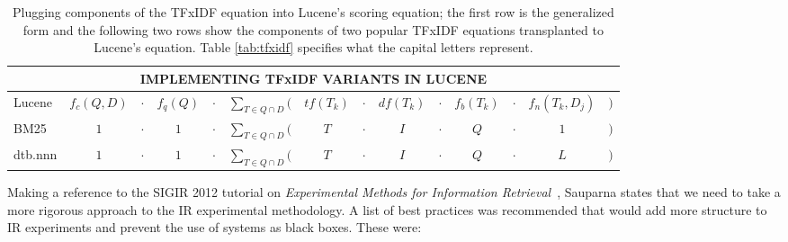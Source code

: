 \begin{table}
\begin{minipage}[t]{0.65\textwidth}
  \end{minipage}
\end{table}

\begin{table}[bht!]
  \centering
  \small
  \begin{minipage}[t]{0.94\textwidth}

    \begin{tabular}{lccccccccccccc}
      \multicolumn{14}{c}{IMPLEMENTING TFxIDF VARIANTS IN LUCENE}
      \\
      \hline\hline

      Lucene    & $f_{c}(Q,D)$ & $\cdot$  & $f_{q}(Q)$
      & $\cdot$ & $\displaystyle\sum_{T \in Q \cap D}($  & $tf(T_{k})$
      & $\cdot$ & $df(T_{k})$  & $\cdot$  & $f_{b}(T_{k})$
      & $\cdot$ & $f_{n}(T_{k}, D_{j})$   & $)$ \\
      
      BM25      & $1$          &  $\cdot$ & $1$
      & $\cdot$ & $\displaystyle\sum_{T \in Q \cap D}($  & $T$
      & $\cdot$ & $I$          & $\cdot$  & $Q$
      & $\cdot$ & $1$          & $)$ \\

      dtb.nnn   & $1$          & $\cdot$  & $1$
      & $\cdot$ & $\displaystyle\sum_{T \in Q \cap D}($  & $T$
      & $\cdot$ & $I$          & $\cdot$  & $Q$
      & $\cdot$ & $L$          & $)$ \\

      \hline\hline
    \end{tabular}

    \caption{\small Plugging components of the TFxIDF equation into
      Lucene's scoring equation; the first row is the generalized form
      and the following two rows show the components of two popular
      TFxIDF equations transplanted to Lucene's equation. Table
      \ref{tab:tfxidf} specifies what the capital letters represent.}

    \label{tab:lucene}

  \end{minipage}
\end{table}


Making a reference to the SIGIR 2012 tutorial on \emph{Experimental
  Methods for Information
  Retrieval}~\cite{Metzler:2012:EMI:2348283.2348534}, Sauparna states
that we need to take a more rigorous approach to the IR experimental
methodology. A list of best practices was recommended that would add
more structure to IR experiments and prevent the use of systems as
black boxes. These were:

